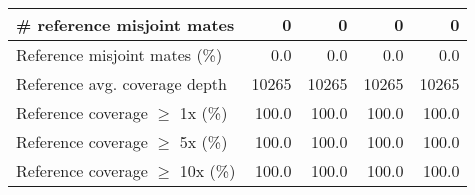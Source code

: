\documentclass[12pt,a4paper]{article}
\begin{document}
\begin{table}[ht]
\begin{center}
\begin{tabular}{|l*{4}{|r}|}
\# reference misjoint mates & 0 & 0 & 0 & 0 \\ \hline
Reference misjoint mates (\%) & 0.0 & 0.0 & 0.0 & 0.0 \\ \hline
Reference avg. coverage depth & 10265 & 10265 & 10265 & 10265 \\ \hline
Reference coverage $\geq$ 1x (\%) & 100.0 & 100.0 & 100.0 & 100.0 \\ \hline
Reference coverage $\geq$ 5x (\%) & 100.0 & 100.0 & 100.0 & 100.0 \\ \hline
Reference coverage $\geq$ 10x (\%) & 100.0 & 100.0 & 100.0 & 100.0 \\ \hline
\end{tabular}
\end{center}
\end{table}
\end{document}
